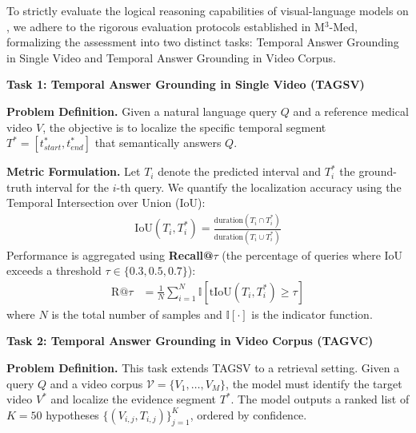 To strictly evaluate the logical reasoning capabilities of visual-language models on \BenchmarkName, we adhere to the rigorous evaluation protocols established in M$^3$-Med, formalizing the assessment into two distinct tasks: Temporal Answer Grounding in Single Video and Temporal Answer Grounding in Video Corpus.

\textbf{Task 1: Temporal Answer Grounding in Single Video (TAGSV)}

\textbf{Problem Definition.} Given a natural language query $Q$ and a reference medical video $V$, the objective is to localize the specific temporal segment $T^* = [t_{start}^*, t_{end}^*]$ that semantically answers $Q$.

\textbf{Metric Formulation.} Let $T_i$ denote the predicted interval and $T_i^*$ the ground-truth interval for the $i$-th query. We quantify the localization accuracy using the Temporal Intersection over Union (IoU):
\begin{align}
    \text{IoU}(T_i, T_i^*) = \frac{\text{duration}(T_i \cap T_i^*)}{\text{duration}(T_i \cup T_i^*)}
\end{align}
Performance is aggregated using 
\textbf{Recall@$\tau$} (the percentage of queries where IoU exceeds a threshold $\tau \in \{0.3, 0.5, 0.7\}$):
\begin{align}
    \text{R@}\tau &= \frac{1}{N} \sum_{i=1}^N \mathbb{I}[\text{tIoU}(T_i, T_i^*) \ge \tau] 
\end{align}
where $N$ is the total number of samples and $\mathbb{I}[\cdot]$ is the indicator function.

\textbf{Task 2: Temporal Answer Grounding in Video Corpus (TAGVC)}

\textbf{Problem Definition.} This task extends TAGSV to a retrieval setting. Given a query $Q$ and a video corpus $\mathcal{V} = \{V_1, \dots, V_M\}$, the model must identify the target video $V^*$ and localize the evidence segment $T^*$. The model outputs a ranked list of $K=50$ hypotheses $\{(V_{i,j}, T_{i,j})\}_{j=1}^K$, ordered by confidence.

